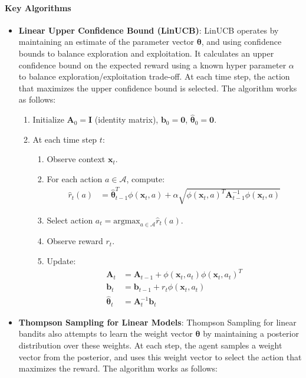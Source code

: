 \paragraph{Key Algorithms}
\begin{itemize}
    \item \textbf{Linear Upper Confidence Bound (LinUCB)}: LinUCB operates by maintaining an estimate of the parameter vector $\boldsymbol{\theta}$, and using confidence bounds to balance exploration and exploitation. It calculates an upper confidence bound on the expected reward using a known hyper parameter $\alpha$ to balance exploration/exploitation trade-off. At each time step, the action that maximizes the upper confidence bound is selected. The algorithm works as follows:
    \begin{enumerate}
        \item Initialize $\mathbf{A}_0 = \mathbf{I}$ (identity matrix), $\mathbf{b}_0 = \mathbf{0}$, $\hat{\boldsymbol{\theta}}_0 = \mathbf{0}$.
        \item At each time step $t$:
          \begin{enumerate}
              \item Observe context $\mathbf{x}_t$.
              \item For each action $a \in \mathcal{A}$, compute:
              \begin{align*}
                \hat{r}_t(a) &= \hat{\boldsymbol{\theta}}_{t-1}^T \phi(\mathbf{x}_t, a) + \alpha \sqrt{ \phi(\mathbf{x}_t, a)^T \mathbf{A}_{t-1}^{-1} \phi(\mathbf{x}_t, a)}
              \end{align*}
              \item Select action $a_t = \text{argmax}_{a \in \mathcal{A}} \hat{r}_t(a)$.
              \item Observe reward $r_t$.
              \item Update:
              \begin{align*}
                  \mathbf{A}_t &= \mathbf{A}_{t-1} + \phi(\mathbf{x}_t, a_t) \phi(\mathbf{x}_t, a_t)^T \\
                  \mathbf{b}_t &= \mathbf{b}_{t-1} + r_t \phi(\mathbf{x}_t, a_t) \\
                  \hat{\boldsymbol{\theta}}_t &= \mathbf{A}_t^{-1} \mathbf{b}_t
              \end{align*}
          \end{enumerate}
    \end{enumerate}
    \item \textbf{Thompson Sampling for Linear Models}: Thompson Sampling for linear bandits also attempts to learn the weight vector $\boldsymbol{\theta}$ by maintaining a posterior distribution over these weights. At each step, the agent samples a weight vector from the posterior, and uses this weight vector to select the action that maximizes the reward. The algorithm works as follows:

\end{itemize}
